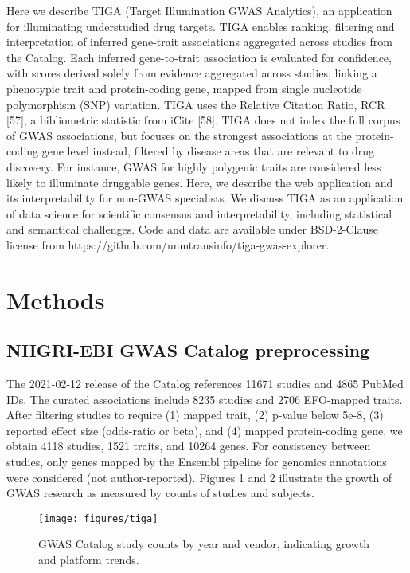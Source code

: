 Here we describe TIGA (Target Illumination GWAS Analytics), an application for illuminating understudied drug targets. TIGA enables ranking, filtering and interpretation of inferred gene-trait associations aggregated across studies from the Catalog. Each inferred gene-to-trait association is evaluated for confidence, with scores derived solely from evidence aggregated across studies, linking a phenotypic trait and protein-coding gene, mapped from single nucleotide polymorphism (SNP) variation. TIGA uses the Relative Citation Ratio, RCR [57], a bibliometric statistic from iCite [58]. TIGA does not index the full corpus of GWAS associations, but focuses on the strongest associations at the protein-coding gene level instead, filtered by disease areas that are relevant to drug discovery. For instance, GWAS for highly polygenic traits are considered less likely to illuminate druggable genes. Here, we describe the web application and its interpretability for non-GWAS specialists. We discuss TIGA as an application of data science for scientific consensus and interpretability, including statistical and semantical challenges. Code and data are available under BSD-2-Clause license from https://github.com/unmtransinfo/tiga-gwas-explorer.

\section{Methods}

\subsection{NHGRI-EBI GWAS Catalog preprocessing}

The 2021-02-12 release of the Catalog references 11671 studies and 4865 PubMed IDs. The curated associations include 8235 studies and 2706 EFO-mapped traits. After filtering studies to require (1) mapped trait, (2) p-value below 5e-8, (3) reported effect size (odds-ratio or beta), and (4) mapped protein-coding gene, we obtain 4118 studies, 1521 traits, and 10264 genes. For consistency between studies, only genes mapped by the Ensembl pipeline for genomics annotations were considered (not author-reported). Figures 1 and 2 illustrate the growth of GWAS research as measured by counts of studies and subjects.  

\begin{figure}
	\texttt{[image: figures/tiga]}
	\caption{GWAS Catalog study counts by year and vendor, indicating growth and platform trends.}
	\label{fig:KGAP_LINCS-IDG_Schematic}
\end{figure}

